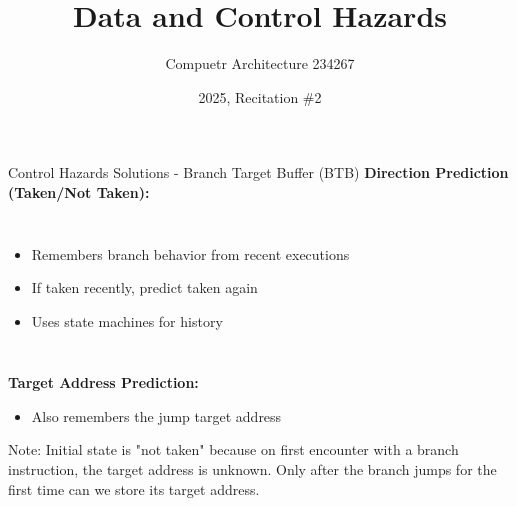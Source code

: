 \documentclass[aspectratio=169,12pt]{beamer}
\title{Data and Control Hazards}
\author{Compuetr Architecture 234267}
\date{2025, Recitation \#2}
\begin{document}
\frame{\titlepage}

\begin{frame}{Control Hazards Solutions - Branch Target Buffer (BTB)}
\textbf{Direction Prediction (Taken/Not Taken):}
\begin{columns}
\begin{itemize}
    \item Remembers branch behavior from recent executions
    \item If taken recently, predict taken again
    \item Uses state machines for history
\end{itemize}

\end{columns}
\vspace{0.5cm}
\textbf{Target Address Prediction:}
\begin{itemize}
    \item Also remembers the jump target address
\end{itemize}

\begin{tcolorbox}[colback=yellow!10]
\small
Note: Initial state is "not taken" because on first encounter with a branch instruction, the target address is unknown. Only after the branch jumps for the first time can we store its target address.
\end{tcolorbox}
\end{frame}
\end{document}
